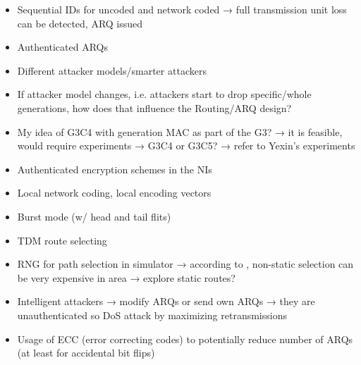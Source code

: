 \begin{itemize}
    \item Sequential IDs for uncoded and network coded → full transmission unit loss can be detected, ARQ issued
    \item Authenticated ARQs
    \item Different attacker models/smarter attackers
    \item If attacker model changes, i.e. attackers start to drop specific/whole generations,
        how does that influence the Routing/ARQ design?
    \item My idea of G3C4 with generation MAC as part of the G3? → it is feasible, would require experiments → G3C4 or G3C5? → refer to Yexin's
        experiments
    \item Authenticated encryption schemes in the NIs
    \item Local network coding, local encoding vectors
    \item Burst mode (w/ head and tail flits)
    \item TDM route selecting
    \item RNG for path selection in simulator → according to \cite{stefan11enhancingnocs}, non-static selection can be very expensive in area →
        explore static routes?
    \item Intelligent attackers → modify ARQs or send own ARQs → they are unauthenticated so DoS attack by maximizing retransmissions
    \item Usage of ECC (error correcting codes) to potentially reduce number of ARQs (at least for accidental bit flips)
\end{itemize}
